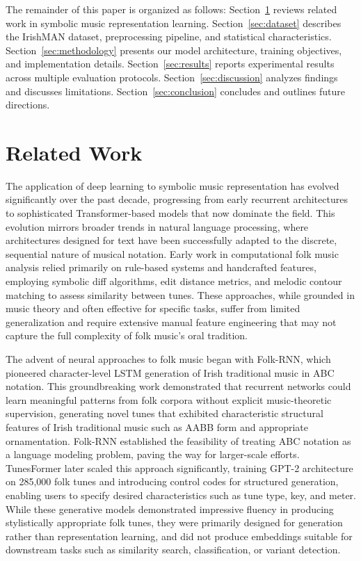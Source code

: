 \documentclass[]{interact}
\theoremstyle{plain}
\theoremstyle{definition}
\theoremstyle{remark}
\begin{document}
The remainder of this paper is organized as follows: Section~\ref{sec:related} reviews related work in symbolic music representation learning. Section~\ref{sec:dataset} describes the IrishMAN dataset, preprocessing pipeline, and statistical characteristics. Section~\ref{sec:methodology} presents our model architecture, training objectives, and implementation details. Section~\ref{sec:results} reports experimental results across multiple evaluation protocols. Section~\ref{sec:discussion} analyzes findings and discusses limitations. Section~\ref{sec:conclusion} concludes and outlines future directions.

\section{Related Work}\label{sec:related}

The application of deep learning to symbolic music representation has evolved significantly over the past decade, progressing from early recurrent architectures to sophisticated Transformer-based models that now dominate the field. This evolution mirrors broader trends in natural language processing, where architectures designed for text have been successfully adapted to the discrete, sequential nature of musical notation. Early work in computational folk music analysis relied primarily on rule-based systems and handcrafted features, employing symbolic diff algorithms, edit distance metrics, and melodic contour matching to assess similarity between tunes. These approaches, while grounded in music theory and often effective for specific tasks, suffer from limited generalization and require extensive manual feature engineering that may not capture the full complexity of folk music's oral tradition.

The advent of neural approaches to folk music began with Folk-RNN, which pioneered character-level LSTM generation of Irish traditional music in ABC notation. This groundbreaking work demonstrated that recurrent networks could learn meaningful patterns from folk corpora without explicit music-theoretic supervision, generating novel tunes that exhibited characteristic structural features of Irish traditional music such as AABB form and appropriate ornamentation. Folk-RNN established the feasibility of treating ABC notation as a language modeling problem, paving the way for larger-scale efforts. TunesFormer later scaled this approach significantly, training GPT-2 architecture on 285,000 folk tunes and introducing control codes for structured generation, enabling users to specify desired characteristics such as tune type, key, and meter. While these generative models demonstrated impressive fluency in producing stylistically appropriate folk tunes, they were primarily designed for generation rather than representation learning, and did not produce embeddings suitable for downstream tasks such as similarity search, classification, or variant detection.
\end{document}
